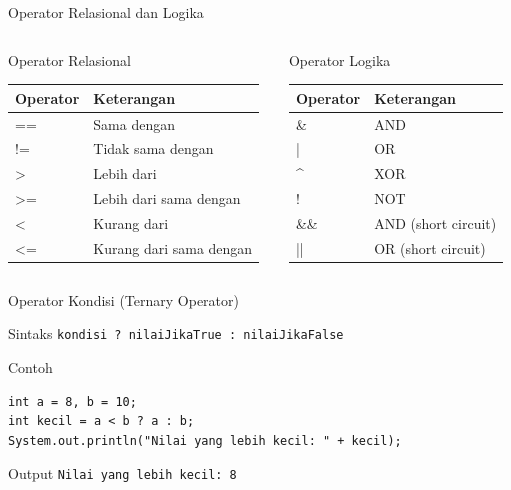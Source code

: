 \documentclass{beamer}
\begin{document}
\begin{frame}{Operator Relasional dan Logika}
  \begin{columns}[T]
    \begin{column}{0.48\textwidth}
      \begin{block}{Operator Relasional}
        \scriptsize
        \begin{tabular}{|l|l|}
        \hline
        \textbf{Operator} & \textbf{Keterangan} \\
        \hline
        == & Sama dengan \\
        != & Tidak sama dengan \\
        > & Lebih dari \\
        >= & Lebih dari sama dengan \\
        < & Kurang dari \\
        <= & Kurang dari sama dengan \\
        \hline
        \end{tabular}
      \end{block}
    \end{column}
    
    \begin{column}{0.48\textwidth}
      \begin{block}{Operator Logika}
        \scriptsize
        \begin{tabular}{|l|l|}
        \hline
        \textbf{Operator} & \textbf{Keterangan} \\
        \hline
        \& & AND \\
        | & OR \\
        \^{} & XOR \\
        ! & NOT \\
        \&\& & AND (short circuit) \\
        || & OR (short circuit) \\
        \hline
        \end{tabular}
      \end{block}
    \end{column}
  \end{columns}
\end{frame}

\begin{frame}[fragile]{Operator Kondisi (Ternary Operator)}
  \begin{block}{Sintaks}
    \texttt{kondisi ? nilaiJikaTrue : nilaiJikaFalse}
  \end{block}
  
  \begin{exampleblock}{Contoh}
\begin{lstlisting}
int a = 8, b = 10;
int kecil = a < b ? a : b;
System.out.println("Nilai yang lebih kecil: " + kecil);
\end{lstlisting}
  \end{exampleblock}
  
  \begin{alertblock}{Output}
    \texttt{Nilai yang lebih kecil: 8}
  \end{alertblock}
\end{frame}
\end{document}

